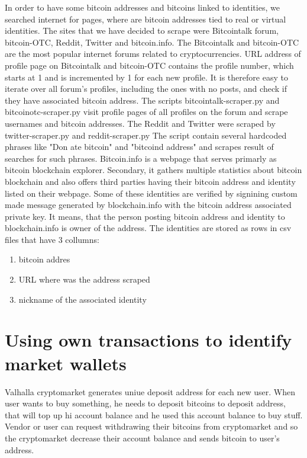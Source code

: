 \documentclass[
  digital, %
  table,   %
  lof,     %
  lot,     %
  oneside
]{fithesis3}
\begin{document}
In order to have some bitcoin addresses and bitcoins linked to identities,
we searched internet for pages, where are bitcoin addresses tied to real or virtual identities.
The sites that we have decided to scrape were Bitcointalk forum, bitcoin-OTC, Reddit,
Twitter and bitcoin.info.
The Bitcointalk and bitcoin-OTC are the most popular internet forums
related to cryptocurrencies. URL address of profile page on Bitcointalk
and bitcoin-OTC contains the profile number, which starts at 1 and is  incremented by 1
for each new profile. 
It is therefore easy to iterate over all forum's profiles,
including the ones with no posts, and check if they have associated bitcoin address.
The scripts bitcointalk-scraper.py and bitcoinotc-scraper.py
visit profile pages of all profiles on the forum and scrape usernames and bitcoin addresses. 
The Reddit and Twitter were scraped by twitter-scraper.py and reddit-scraper.py
The script contain several hardcoded phrases like "Don
ate bitcoin" and "bitcoind address" and scrapes 
result of searches for such phrases.
Bitcoin.info is a webpage that serves primarly as bitcoin blockchain explorer. Secondary,
it gathers multiple statistics about bitcoin blockchain and also offers
third parties having their bitcoin address and identity listed on their webpage.
Some of these identities are verified by signining
custom made message generated by blockchain.info
with the bitcoin address associated private key. It means, that the person
posting bitcoin address and identity to blockchain.info is owner of the address.
The identities are stored as rows in csv files that have 3 collumns:

\begin{enumerate}
 \item bitcoin addres
 \item URL where was the address scraped
 \item nickname of the associated identity
\end{enumerate}

\section{Using own transactions to identify market wallets}

Valhalla cryptomarket generates uniue deposit address for each new user.
When user wants to buy something, he needs to deposit bitcoins to deposit address,
that will top up hi account balance and he used this account balance to buy stuff.
Vendor or user can request withdrawing their bitcoins from cryptomarket and so
the cryptomarket decrease their account balance and sends bitcoin to user's address.
\end{document}
